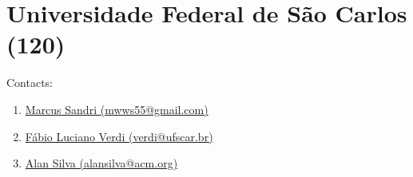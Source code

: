 \section{Universidade Federal de São Carlos (120)}
\label{sec:UFSCAR}

Contacts:
\begin{enumerate}
 \item {}\href{mailto:mwws55@gmail.com}{Marcus Sandri (mwws55@gmail.com)}
 \item {}\href{mailto:verdi@ufscar.br}{Fábio Luciano Verdi (verdi@ufscar.br)}
 \item {}\href{mailto:alansilva@acm.org}{Alan Silva (alansilva@acm.org)}
\end{enumerate}

